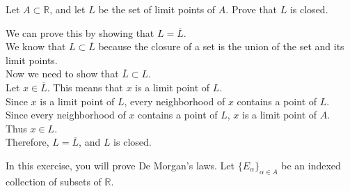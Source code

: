 \documentclass[answers,12pt,addpoints]{exam}
\begin{document}
\begin{questions}
    \question Let $A \subset \mathbb{R}$, and let $L$ be the set of limit points of $A$. Prove that $L$ is closed.
    \begin{solution}
        We can prove this by showing that $L = \overline{L}$.\\
        We know that $L \subset \overline{L}$ because the closure of a set is the union of the set and its limit points.\\
        Now we need to show that $\overline{L} \subset L$.\\
        Let $x \in \overline{L}$. This means that $x$ is a limit point of $L$.\\
        Since $x$ is a limit point of $L$, every neighborhood of $x$ contains a point of $L$.\\
        Since every neighborhood of $x$ contains a point of $L$, $x$ is a limit point of $A$.\\
        Thus $x \in L$.\\
        Therefore, $L = \overline{L}$, and $L$ is closed.
    \end{solution}

    \question In this exercise, you will prove De Morgan’s laws. Let $\{E_\alpha\}_{\alpha \in A}$ be an indexed collection of subsets of $\mathbb{R}$.
\end{questions}
\end{document}
